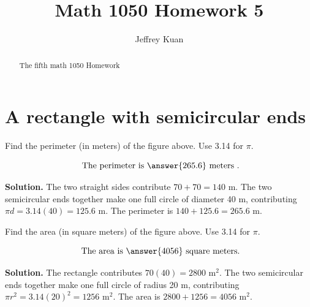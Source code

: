 \documentclass{ximera}
\author{Jeffrey Kuan}
\title{Math 1050 Homework 5}
\begin{document}
\begin{abstract}
   The fifth math 1050 Homework
\end{abstract}

\maketitle

\section*{A rectangle with semicircular ends}


\begin{problem}
   Find the perimeter (in meters) of the figure above. Use 3.14 for \(\pi\).

\[
\text{ The perimeter is } \answer{265.6} \text{ meters }.
\]

\begin{hint}
\textbf{Solution.} The two straight sides contribute $70+70=140$ m. The two semicircular
ends together make one full circle of diameter 40 m, contributing
$\pi d = 3.14(40) = 125.6$ m. The perimeter is $140 + 125.6 = 265.6$ m.
\end{hint}
\end{problem}

\begin{problem}
   Find the area (in square meters) of the figure above. Use 3.14 for \(\pi\).

   \[
   \text{ The area is } \answer{4056} \text{ square meters}.
   \]

\begin{hint}
\textbf{Solution.} The rectangle contributes $70(40) = 2800$ m$^2$. The two semicircular
ends together make one full circle of radius 20 m, contributing
$\pi r^2 = 3.14(20)^2 = 1256$ m$^2$. The area is $2800 + 1256 = 4056$ m$^2$.
\end{hint}
\end{problem}
\end{document}
